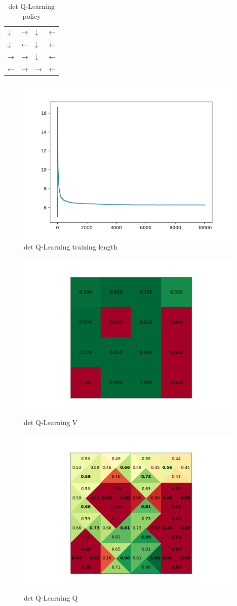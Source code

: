 \documentclass[a4paper]{article}
\begin{document}
\begin{table}[!ht]
	\centering
	\begin{tabular}{llll}
		↓ & → & ↓ & ← \\
		↓ & ← & ↓ & ← \\
		→ & → & ↓ & ← \\
		← & → & → & ←
	\end{tabular}
	\caption{det Q-Learning policy}
\end{table}

\begin{figure}[!ht]
	\centering
	\includegraphics[width=0.8\linewidth]{det_qlearn_length}
	\caption{det Q-Learning training length}
	\label{fig:det_qlearnlength}
\end{figure}
\begin{figure}[!ht]
	\centering
	\includegraphics[width=0.6\linewidth]{det_qlearn_v}
	\caption{det Q-Learning V}
	\label{fig:det_qlearnreward}
\end{figure}
\begin{figure}[!ht]
	\centering
	\includegraphics[width=0.6\linewidth]{det_qlearn_q}
	\caption{det Q-Learning Q}
	\label{fig:det_qlearnpolicy}
\end{figure}
\end{document}
